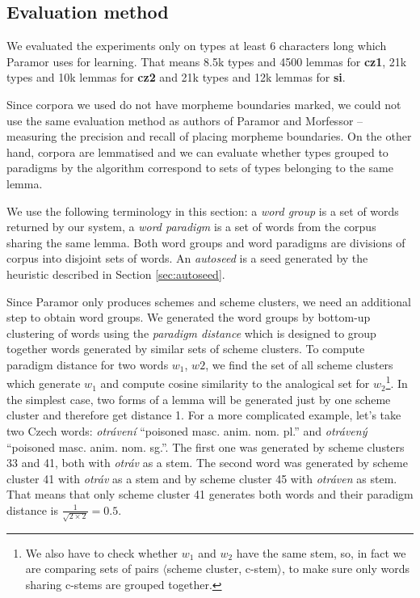 \documentclass{itatnew}
\newcommand{\gloss}[2]{\emph{#1} ``#2''}
\newcommand{\e}[1]{\textit{#1}} %
\begin{document}
\subsection{Evaluation method}

\noindent
We evaluated the experiments only on types at least 6 characters long which Paramor uses for learning. That means 8.5k types and 4500 lemmas for \textbf{cz1}, 21k types and 10k lemmas for \textbf{cz2} and 21k types and 12k lemmas for \textbf{si}.

Since corpora we used do not have morpheme boundaries marked, we could not use the same evaluation method as authors of Paramor and Morfessor -- measuring the precision and recall of placing morpheme boundaries. On the other hand, corpora are lemmatised and we can evaluate whether types grouped to paradigms by the algorithm correspond to sets of types belonging to the same lemma.

We use the following terminology in this section: a \e{word group} is a set of words returned by our system, a \e{word paradigm} is a set of words from the corpus sharing the same lemma. Both word groups and word paradigms are divisions of corpus into disjoint sets of words. An \e{autoseed} is a seed generated by the heuristic described in Section \ref{sec:autoseed}.

Since Paramor only produces schemes and scheme clusters, we need an additional step to obtain word groups. We generated the word groups by bottom-up clustering of words using the \e{paradigm distance} which is designed to group together words generated by similar sets of scheme clusters. To compute paradigm distance for two words $w_1$, $w2$, we find the set of all scheme clusters which generate $w_1$ and compute cosine similarity to the analogical set for $w_2$\footnote{We also have to check whether $w_1$ and $w_2$ have the same stem, so, in fact we are comparing sets of pairs $\langle$scheme cluster, c-stem$\rangle$, to make sure only words sharing c-stems are grouped together.}. In the simplest case, two forms of a lemma will be generated just by one scheme cluster and therefore get distance 1. For a more complicated example, let's take two Czech words: \gloss{otrávení}{poisoned masc. anim. nom. pl.} and \gloss{otrávený}{poisoned masc. anim. nom. sg.}. The first one was generated by scheme clusters 33 and 41, both with \e{otráv} as a stem. The second word was generated by scheme cluster 41 with \e{otráv} as a stem and by scheme cluster 45 with \e{otráven} as stem. That means that only scheme cluster 41 generates both words and their paradigm distance is $\frac{1}{\sqrt{2\times2}}=0.5$.
\end{document}
